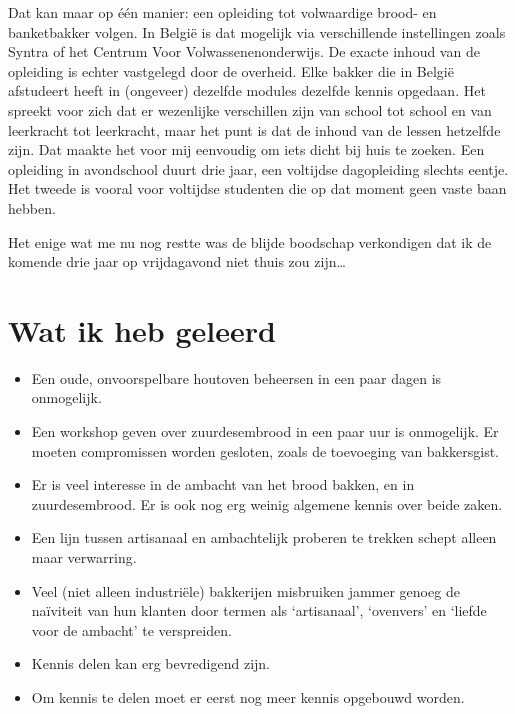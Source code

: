 \documentclass[
  11pt,
  dutch,
]{memoir}
\providecommand{\tightlist}{%
  \setlength{\itemsep}{0pt}\setlength{\parskip}{0pt}}
\begin{document}
Dat kan maar op één manier: een opleiding tot volwaardige brood- en
banketbakker volgen. In België is dat mogelijk via verschillende
instellingen zoals Syntra of het Centrum Voor Volwassenenonderwijs. De
exacte inhoud van de opleiding is echter vastgelegd door de overheid.
Elke bakker die in België afstudeert heeft in (ongeveer) dezelfde
modules dezelfde kennis opgedaan. Het spreekt voor zich dat er
wezenlijke verschillen zijn van school tot school en van leerkracht tot
leerkracht, maar het punt is dat de inhoud van de lessen hetzelfde zijn.
Dat maakte het voor mij eenvoudig om iets dicht bij huis te zoeken. Een
opleiding in avondschool duurt drie jaar, een voltijdse dagopleiding
slechts eentje. Het tweede is vooral voor voltijdse studenten die op dat
moment geen vaste baan hebben.

Het enige wat me nu nog restte was de blijde boodschap verkondigen dat
ik de komende drie jaar op vrijdagavond niet thuis zou zijn\ldots{}

\newpage

\hypertarget{wat-ik-heb-geleerd-1}{%
\section{Wat ik heb geleerd}\label{wat-ik-heb-geleerd-1}}

\begin{itemize}
\tightlist
\item
  Een oude, onvoorspelbare houtoven beheersen in een paar dagen is
  onmogelijk.
\item
  Een workshop geven over zuurdesembrood in een paar uur is onmogelijk.
  Er moeten compromissen worden gesloten, zoals de toevoeging van
  bakkersgist.
\item
  Er is veel interesse in de ambacht van het brood bakken, en in
  zuurdesembrood. Er is ook nog erg weinig algemene kennis over beide
  zaken.
\item
  Een lijn tussen artisanaal en ambachtelijk proberen te trekken schept
  alleen maar verwarring.
\item
  Veel (niet alleen industriële) bakkerijen misbruiken jammer genoeg de
  \mbox{naïviteit} van hun klanten door termen als `artisanaal',
  `ovenvers' en `liefde voor de ambacht' te verspreiden.
\item
  Kennis delen kan erg bevredigend zijn.
\item
  Om kennis te delen moet er eerst nog meer kennis opgebouwd worden.
\end{itemize}
\end{document}

